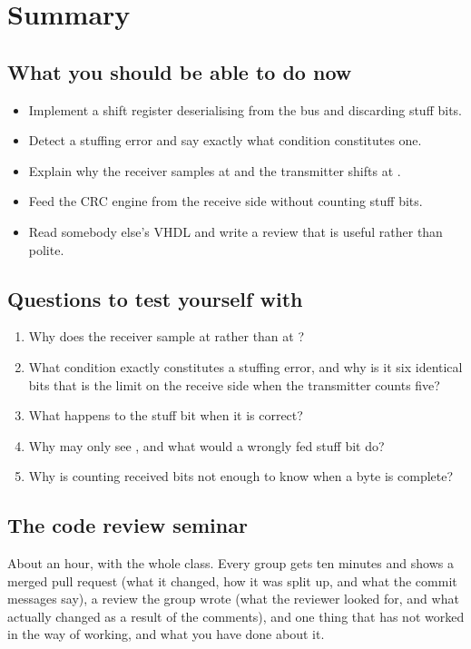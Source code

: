 
\section{Summary}
\label{c15:sec:review}

\subsection*{What you should be able to do now}
\begin{itemize}
  \item Implement a shift register deserialising from the bus and discarding stuff bits.
  \item Detect a stuffing error and say exactly what condition constitutes one.
  \item Explain why the receiver samples at  and the transmitter shifts at
    .
  \item Feed the CRC engine from the receive side without counting stuff bits.
  \item Read somebody else's VHDL and write a review that is useful rather than polite.
\end{itemize}

\subsection*{Questions to test yourself with}
\begin{enumerate}
  \item Why does the receiver sample at  rather than at ?
  \item What condition exactly constitutes a stuffing error, and why is it six identical bits that is
    the limit on the receive side when the transmitter counts five?
  \item What happens to the stuff bit when it is correct?
  \item Why may  only see , and what would a wrongly fed stuff bit do?
  \item Why is counting received bits not enough to know when a byte is complete?
\end{enumerate}

\subsection*{The code review seminar}
About an hour, with the whole class. Every group gets ten minutes and shows a merged pull request
(what it changed, how it was split up, and what the commit messages say), a review the group wrote
(what the reviewer looked for, and what actually changed as a result of the comments), and one thing
that has not worked in the way of working, and what you have done about it.

